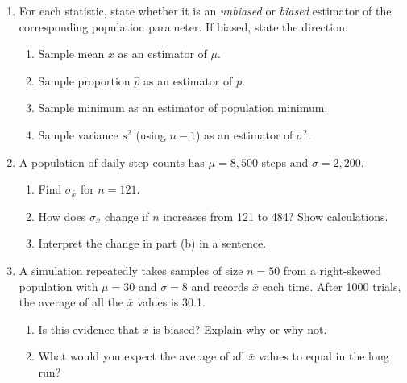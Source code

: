 \documentclass[10pt]{article}
\begin{document}
\namedateperiod

\vspace{0.15in}

\begin{enumerate}

  \item For each statistic, state whether it is an \emph{unbiased} or \emph{biased}
        estimator of the corresponding population parameter. If biased, state the direction.
        \begin{enumerate}[label=\alph*.]
          \item Sample mean $\bar{x}$ as an estimator of $\mu$.
          \item Sample proportion $\hat{p}$ as an estimator of $p$.
          \item Sample minimum as an estimator of population minimum.
          \item Sample variance $s^2$ (using $n-1$) as an estimator of $\sigma^2$.
        \end{enumerate}

  \item A population of daily step counts has $\mu = 8{,}500$ steps and $\sigma = 2{,}200$.
        \begin{enumerate}[label=\alph*.]
          \item Find $\sigma_{\bar{x}}$ for $n = 121$.
                \vspace{0.5in}
          \item How does $\sigma_{\bar{x}}$ change if $n$ increases from 121 to 484?
                Show calculations.
                \vspace{0.6in}
          \item Interpret the change in part (b) in a sentence.
        \end{enumerate}

  \item A simulation repeatedly takes samples of size $n = 50$ from a right-skewed
        population with $\mu = 30$ and $\sigma = 8$ and records $\bar{x}$ each time.
        After 1000 trials, the average of all the $\bar{x}$ values is 30.1.
        \begin{enumerate}[label=\alph*.]
          \item Is this evidence that $\bar{x}$ is biased? Explain why or why not.
          \item What would you expect the average of all $\bar{x}$ values to equal
                in the long run?
        \end{enumerate}

\end{enumerate}
\end{document}
